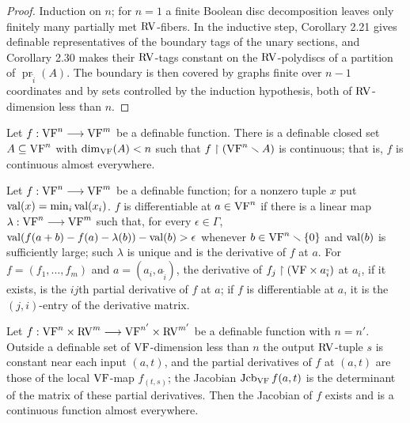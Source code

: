 \begin{proof}
\leanok
Induction on $n$; for $n = 1$ a finite Boolean disc decomposition leaves only finitely many partially met $\mathrm{RV}$-fibers. In the inductive step, Corollary 2.21 gives definable representatives of the boundary tags of the unary sections, and Corollary 2.30 makes their $\mathrm{RV}$-tags constant on the $\mathrm{RV}$-polydiscs of a partition of $\operatorname{pr}_{\tilde i}(A)$. The boundary is then covered by graphs finite over $n-1$ coordinates and by sets controlled by the induction hypothesis, both of $\mathrm{RV}$-dimension less than $n$.
\end{proof}

\setcounter{theorem}{35}
\begin{lemma}
\label{fun-almost-cont}
\leanok
{}
Let $f : \mathrm{VF}^n \longrightarrow \mathrm{VF}^m$ be a definable function. There is a definable closed set $A \subseteq \mathrm{VF}^n$ with $\dim_{\mathrm{VF}}(A) < n$ such that $f \upharpoonright (\mathrm{VF}^n \smallsetminus A)$ is continuous; that is, $f$ is continuous almost everywhere.
\end{lemma}

\setcounter{theorem}{36}
\begin{definition}
\label{defn-diff}
\leanok
{}
Let $f : \mathrm{VF}^n \longrightarrow \mathrm{VF}^m$ be a definable function; for a nonzero tuple $x$ put $\operatorname{val}(x) = \min_i \operatorname{val}(x_i)$. $f$ is differentiable at $a \in \mathrm{VF}^n$ if there is a linear map $\lambda : \mathrm{VF}^n \longrightarrow \mathrm{VF}^m$ such that, for every $\epsilon \in \Gamma$, $\operatorname{val}(f(a+b) - f(a) - \lambda(b)) - \operatorname{val}(b) > \epsilon$ whenever $b \in \mathrm{VF}^n \smallsetminus \{0\}$ and $\operatorname{val}(b)$ is sufficiently large; such $\lambda$ is unique and is the derivative of $f$ at $a$. For $f = (f_1, \ldots, f_m)$ and $a = (a_i, a_{\tilde i})$, the derivative of $f_j \upharpoonright (\mathrm{VF} \times a_{\tilde i})$ at $a_i$, if it exists, is the $ij$th partial derivative of $f$ at $a$; if $f$ is differentiable at $a$, it is the $(j,i)$-entry of the derivative matrix.
\end{definition}

\setcounter{theorem}{37}
\begin{lemma}
\label{diff-almost-every}
\leanok
{}
Let $f : \mathrm{VF}^n \times \mathrm{RV}^m \longrightarrow \mathrm{VF}^{n'} \times \mathrm{RV}^{m'}$ be a definable function with $n = n'$. Outside a definable set of $\mathrm{VF}$-dimension less than $n$ the output $\mathrm{RV}$-tuple $s$ is constant near each input $(a,t)$, and the partial derivatives of $f$ at $(a,t)$ are those of the local $\mathrm{VF}$-map $f_{(t,s)}$; the Jacobian $\operatorname{Jcb}_{\mathrm{VF}} f(a,t)$ is the determinant of the matrix of these partial derivatives. Then the Jacobian of $f$ exists and is a continuous function almost everywhere.
\end{lemma}

